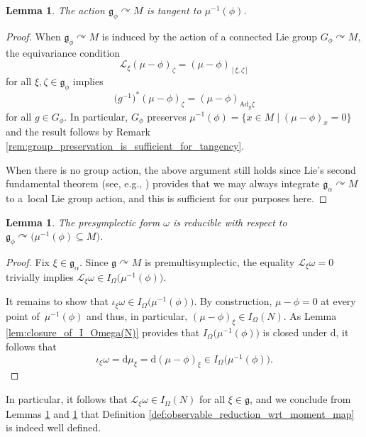 \documentclass[pdftex]{sigma}
\numberwithin{equation}{section}
\newtheorem{Lemma}[Theorem]{Lemma}
\newcommand{\g}{\mathfrak{g}}
\renewcommand{\L}{\mathscr{L}}
\newcommand{\Ad}{\mathrm{Ad}}
\renewcommand{\subset}{\subseteq}
\renewcommand{\d}{\mathrm{d}}
\begin{document}
\begin{Lemma}\label{lem:isotropy_action_is_tangent_to_phi_level_set}
	The action $\g_\phi\curvearrowright M$ is tangent to $\mu^{-1}(\phi)$.
\end{Lemma}

\begin{proof}
	When $\g_\phi\curvearrowright M$ is induced by the action of a connected Lie group $G_\phi\curvearrowright M$, the equivariance condition
	\[
		\L_\xi(\mu-\phi)_\zeta = (\mu-\phi)_{[\xi,\zeta]}
	\]
	for all $\xi,\zeta\in\g_\phi$ implies
	\[
		\bigl(g^{-1}\bigr)^*(\mu-\phi)_\zeta = (\mu-\phi)_{\Ad_g\zeta}
	\]
	for all $g\in G_\phi$. In particular, $G_\phi$ preserves $\mu^{-1}(\phi)=\{x\in M\mid (\mu-\phi)_x = 0\}$ and the result follows by Remark \ref{rem:group_preservation_is_sufficient_for_tangency}.

	When there is no group action, the above argument still holds since Lie's second fundamental theorem (see, e.g., \cite[Theorem~20.22]{Lee12}) provides that we may always integrate $\g_\alpha\curvearrowright M$ to a~local Lie group action, and this is sufficient for our purposes here.
\end{proof}

\begin{Lemma}\label{lem:omega_is_reducible_over_phi_level_set}
	The presymplectic form $\omega$ is reducible with respect to $\g_\phi\curvearrowright\bigl(\mu^{-1}(\phi)\subset M\bigr)$.
\end{Lemma}

\begin{proof}
	Fix $\xi\in\g_\alpha$. Since $\g\curvearrowright M$ is premultisymplectic, the equality $\L_\xi\omega=0$ trivially implies $\L_\xi\omega\in I_\Omega\bigl(\mu^{-1}(\phi)\bigr)$.

	It remains to show that $\iota_\xi\omega\in I_\Omega\bigl(\mu^{-1}(\phi)\bigr)$. By construction, $\mu-\phi=0$ at every point of~$\mu^{-1}(\phi)$ and thus, in particular, $(\mu-\phi)_\xi\in I_\Omega(N)$. As Lemma \ref{lem:closure_of_I_Omega(N)} provides that $I_\Omega\bigl(\mu^{-1}(\phi)\bigr)$ is closed under $\d$, it follows that
	\[
		\iota_\xi\omega = \d\mu_\xi = \d(\mu-\phi)_\xi \in I_\Omega\bigl(\mu^{-1}(\phi)\bigr).
\tag*{\qed}
\]
\renewcommand{\qed}{}
\end{proof}

In particular, it follows that $\L_\xi\omega\in I_\Omega(N)$ for all $\xi\in\g$, and we conclude from Lemmas \ref{lem:isotropy_action_is_tangent_to_phi_level_set} and \ref{lem:omega_is_reducible_over_phi_level_set} that Definition \ref{def:observable_reduction_wrt_moment_map} is indeed well defined.
\end{document}

